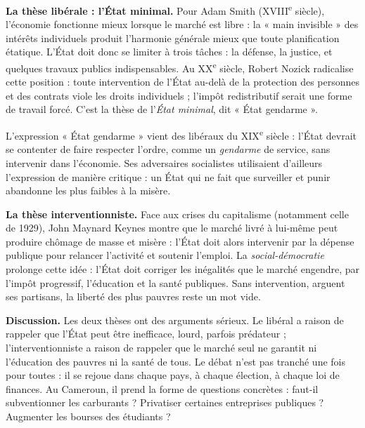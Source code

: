 \documentclass[11pt]{article}
\begin{document}
\textbf{La thèse libérale : l'État minimal.} Pour Adam Smith (XVIII\textsuperscript{e} siècle), l'économie fonctionne mieux lorsque le marché est libre : la « main invisible » des intérêts individuels produit l'harmonie générale mieux que toute planification étatique. L'État doit donc se limiter à trois tâches : la défense, la justice, et quelques travaux publics indispensables. Au XX\textsuperscript{e} siècle, Robert Nozick radicalise cette position : toute intervention de l'État au-delà de la protection des personnes et des contrats viole les droits individuels ; l'impôt redistributif serait une forme de travail forcé. C'est la thèse de l'\emph{État minimal}, dit « État gendarme ».

\begin{savaistu}
L'expression « État gendarme » vient des libéraux du XIX\textsuperscript{e} siècle : l'État devrait se contenter de faire respecter l'ordre, comme un \emph{gendarme} de service, sans intervenir dans l'économie. Ses adversaires socialistes utilisaient d'ailleurs l'expression de manière critique : un État qui ne fait que surveiller et punir abandonne les plus faibles à la misère.
\end{savaistu}

\textbf{La thèse interventionniste.} Face aux crises du capitalisme (notamment celle de 1929), John Maynard Keynes montre que le marché livré à lui-même peut produire chômage de masse et misère : l'État doit alors intervenir par la dépense publique pour relancer l'activité et soutenir l'emploi. La \emph{social-démocratie} prolonge cette idée : l'État doit corriger les inégalités que le marché engendre, par l'impôt progressif, l'éducation et la santé publiques. Sans intervention, arguent ses partisans, la liberté des plus pauvres reste un mot vide.

\textbf{Discussion.} Les deux thèses ont des arguments sérieux. Le libéral a raison de rappeler que l'État peut être inefficace, lourd, parfois prédateur ; l'interventionniste a raison de rappeler que le marché seul ne garantit ni l'éducation des pauvres ni la santé de tous. Le débat n'est pas tranché une fois pour toutes : il se rejoue dans chaque pays, à chaque élection, à chaque loi de finances. Au Cameroun, il prend la forme de questions concrètes : faut-il subventionner les carburants ? Privatiser certaines entreprises publiques ? Augmenter les bourses des étudiants ?
\end{document}
